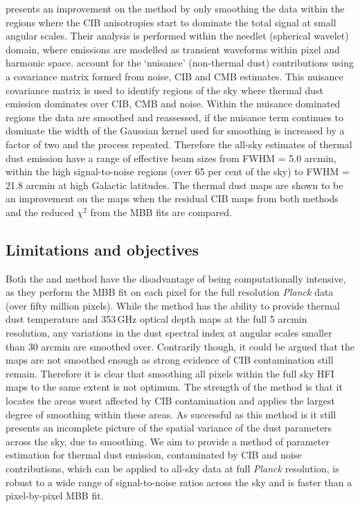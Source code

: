 \documentclass[a4paper,fleqn,usenatbib]{mnras}
\begin{document}
\citet{gnilc} presents an improvement on the \citet{pr2} method by only smoothing the data within the regions where the CIB anisotropies start to dominate the total signal at small angular scales. Their analysis is performed within the needlet (spherical wavelet) domain, where emissions are modelled as transient waveforms within pixel and harmonic space. \citet{gnilc} account for the `nuisance'  (non-thermal dust) contributions using a covariance matrix formed from noise, CIB and CMB estimates. This nuisance covariance matrix is used to identify regions of the sky where thermal dust emission dominates over CIB, CMB and noise. Within the nuisance dominated regions the data are smoothed and reassessed, if the nuisance term continues to dominate the width of the Gaussian kernel used for smoothing is increased by a factor of two and the process repeated. Therefore the \citet{gnilc} all-sky estimates of thermal dust emission have a range of effective beam sizes from FWHM = 5.0 arcmin, within the high signal-to-noise regions (over 65 per cent of the sky) to FWHM = 21.8 arcmin at high Galactic latitudes. The \citet{gnilc} thermal dust maps are shown to be an improvement on the \citet{pr2} maps when the residual CIB maps from both methods and the reduced $\chi^2$ from the MBB fits are compared. 

\subsection{Limitations and objectives}

Both the \citet{pr2} and \citet{gnilc} method have the disadvantage of being computationally intensive, as they perform the MBB fit on each pixel for the full resolution {\it{Planck}} data (over fifty million pixels). While the \citet{pr2} method has the ability to provide thermal dust temperature and 353\,GHz optical depth maps at the full 5 arcmin resolution, any variations in the dust spectral index at angular scales smaller than 30 arcmin are smoothed over. Contrarily though, it could be argued that the \citet{pr2} maps are not smoothed enough as strong evidence of CIB contamination still remain. Therefore it is clear that smoothing all pixels within the full sky HFI maps to the same extent is not optimum. The strength of the \citet{gnilc} method is that it locates the areas worst affected by CIB contamination and applies the largest degree of smoothing within these areas. As successful as this method is it still presents an incomplete picture of the spatial variance of the dust parameters across the sky, due to smoothing. We aim to provide a method of parameter estimation for thermal dust emission, contaminated by CIB and noise contributions, which can be applied to all-sky data at full {\it{Planck}} resolution, is robust to a wide range of signal-to-noise ratios across the sky and is faster than a pixel-by-pixel MBB fit. 
\end{document}
